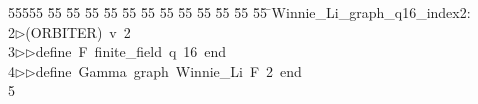 %
%
\begin{tabbing}
55555 \= 55 \= 55 \= 55 \= 55 \= 55 \= 55 \= 55 \= 55 \= 55 \= 55 \= 55 \= 55 \= \>Winnie\_Li\_graph\_q16\_index2:\\[0pt]
2\>$\triangleright$\>(ORBITER)\ v\ 2\ \\[0pt]
3\>$\triangleright$\>$\triangleright$\>define\ F\ finite\_field\ q\ 16\ end\ \\[0pt]
4\>$\triangleright$\>$\triangleright$\>define\ Gamma\ graph\ Winnie\_Li\ F\ 2\ end\ \\[0pt]
5\>\end{tabbing}
